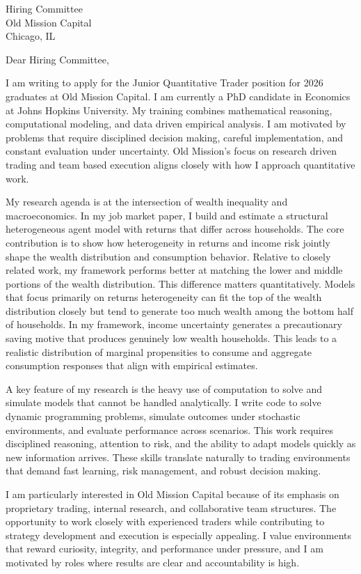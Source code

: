 \documentclass[11pt]{letter}
\begin{document}
\begin{letter}{Hiring Committee \\ Old Mission Capital \\ Chicago, IL}

\opening{Dear Hiring Committee,}

I am writing to apply for the Junior Quantitative Trader position for 2026 graduates at Old Mission Capital. I am currently a PhD candidate in Economics at Johns Hopkins University. My training combines mathematical reasoning, computational modeling, and data driven empirical analysis. I am motivated by problems that require disciplined decision making, careful implementation, and constant evaluation under uncertainty. Old Mission’s focus on research driven trading and team based execution aligns closely with how I approach quantitative work.

My research agenda is at the intersection of wealth inequality and macroeconomics. In my job market paper, I build and estimate a structural heterogeneous agent model with returns that differ across households. The core contribution is to show how heterogeneity in returns and income risk jointly shape the wealth distribution and consumption behavior. Relative to closely related work, my framework performs better at matching the lower and middle portions of the wealth distribution. This difference matters quantitatively. Models that focus primarily on returns heterogeneity can fit the top of the wealth distribution closely but tend to generate too much wealth among the bottom half of households. In my framework, income uncertainty generates a precautionary saving motive that produces genuinely low wealth households. This leads to a realistic distribution of marginal propensities to consume and aggregate consumption responses that align with empirical estimates.

A key feature of my research is the heavy use of computation to solve and simulate models that cannot be handled analytically. I write code to solve dynamic programming problems, simulate outcomes under stochastic environments, and evaluate performance across scenarios. This work requires disciplined reasoning, attention to risk, and the ability to adapt models quickly as new information arrives. These skills translate naturally to trading environments that demand fast learning, risk management, and robust decision making.

I am particularly interested in Old Mission Capital because of its emphasis on proprietary trading, internal research, and collaborative team structures. The opportunity to work closely with experienced traders while contributing to strategy development and execution is especially appealing. I value environments that reward curiosity, integrity, and performance under pressure, and I am motivated by roles where results are clear and accountability is high.


\end{letter}
\end{document}
